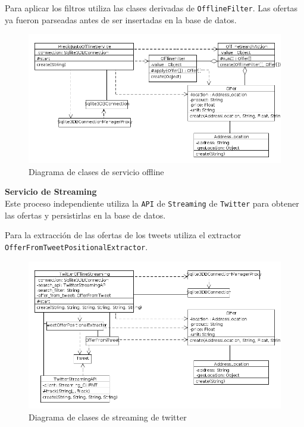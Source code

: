 Para aplicar los filtros utiliza las clases derivadas de \texttt{OfflineFilter}. Las ofertas
ya fueron parseadas antes de ser insertadas en la base de datos.

\begin{figure}[h]
\centerline{\includegraphics[width=0.9\paperwidth]{./imgs/class_diagram_offline_service.png}}
\caption{Diagrama de clases de servicio offline}
\label{fig:class_offline_service}
\end{figure}

\textbf{Servicio de Streaming}\\

Este proceso independiente utiliza la \texttt{API} de \texttt{Streaming} de \texttt{Twitter} para obtener las ofertas y persistirlas en la base de datos.

Para la extracci\'on de las ofertas de los tweets utiliza el extractor \texttt{OfferFromTweetPositionalExtractor}.

\begin{figure}[h]
\centerline{\includegraphics[width=0.9\paperwidth]{./imgs/class_diagram_offline_streaming.png}}
\caption{Diagrama de clases de streaming de twitter}
\label{fig:class_offline_streaming}
\end{figure}

